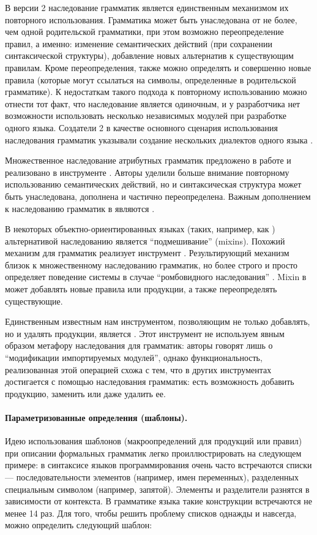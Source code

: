В  версии 2 \cite{ParrQ95} наследование грамматик является единственным механизмом их повторного использования. Грамматика может быть унаследована от не более, чем одной родительской грамматики, при этом возможно переопределение правил, а именно: изменение семантических действий (при сохранении синтаксической структуры),  добавление новых альтернатив к существующим правилам. Кроме переопределения, также можно определять и совершенно новые правила (которые могут ссылаться на символы, определенные в родительской грамматике). К недостаткам такого подхода к повторному использованию можно отнести тот факт, что наследование является одиночным, и у разработчика нет возможности использовать несколько независимых модулей при разработке одного языка. Создатели  2 в качестве основного сценария использования наследования грамматик указывали создание нескольких диалектов одного языка \cite{???}.

Множественное наследование атрибутных грамматик предложено в работе \cite{MAGInh} и реализовано в инструменте . %
Авторы уделили больше внимание повторному использованию семантических действий, но и синтаксическая структура может быть унаследована, дополнена и частично переопределена.
Важным дополнением к наследованию грамматик в  являются .

В некоторых объектно-ориентированных языках (таких, например, как  \cite{Odersky2008}) альтернативой наследованию является ``подмешивание'' (mixins). Похожий механизм для грамматик реализует инструмент  \cite{xText}. Результирующий механизм близок к множественному наследованию грамматик, но более строго и просто определяет поведение системы в случае ``ромбовидного наследования'' \cite{C++}. Mixin в  может добавлять новые правила или продукции, а также переопределять существующие.

Единственным известным нам инструментом, позволяющим не только добавлять, но и удалять продукции, является  \cite{Rats!}. Этот инструмент не используем явным образом метафору наследования для грамматик: авторы говорят лишь о ``модификации импортируемых модулей'', однако функциональность, реализованная этой операцией схожа с тем, что в других инструментах достигается с помощью наследования грамматик: есть возможность добавить продукцию, заменить или даже удалить ее.


\paragraph*{Параметризованные определения (шаблоны).}
Идею использования шаблонов (макроопределений для продукций или правил) при описании формальных грамматик легко проиллюстрировать на следующем примере: в синтаксисе языков программирования очень часто встречаются списки --- последовательности элементов (например, имен переменных), разделенных специальным символом (например, запятой). Элементы и разделители разнятся в зависимости от контекста. В грамматике языка  \cite{JLS} такие конструкции встречаются не менее 14 раз. Для того, чтобы решить проблему списков однажды и навсегда, можно определить следующий шаблон:

